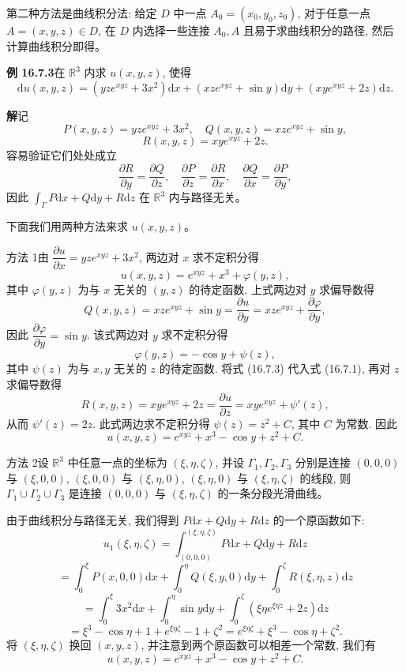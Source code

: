 \documentclass[UTF8,12pt,a4paper,fontset=fandol]{ctexart}
\begin{document}
第二种方法是曲线积分法: 给定 $D$ 中一点 $A_0=(x_0,y_0,z_0)$, 对于任意一点 $A=(x,y,z)\in D$, 在 $D$ 内选择一些连接 $A_0,A$ 且易于求曲线积分的路径, 然后计算曲线积分即得。

\noindent\textbf{例 16.7.3}\quad 在 $\mathbb R^3$ 内求 $u(x,y,z)$, 使得
\[
  \mathrm du(x,y,z)=(yze^{xyz}+3x^2)\mathrm dx+(xze^{xyz}+\sin y)\mathrm dy+(xye^{xyz}+2z)\mathrm dz.
\]

\noindent\textbf{解}\quad 记
\[
  P(x,y,z)=yze^{xyz}+3x^2,\quad Q(x,y,z)=xze^{xyz}+\sin y,
\]
\[
  R(x,y,z)=xye^{xyz}+2z.
\]
容易验证它们处处成立
\[
  \frac{\partial R}{\partial y}=\frac{\partial Q}{\partial z},\quad
  \frac{\partial P}{\partial z}=\frac{\partial R}{\partial x},\quad
  \frac{\partial Q}{\partial x}=\frac{\partial P}{\partial y},
\]
因此 $\int_\Gamma P\mathrm dx+Q\mathrm dy+R\mathrm dz$ 在 $\mathbb R^3$ 内与路径无关。

下面我们用两种方法来求 $u(x,y,z)$。

方法 1\quad 由 $\dfrac{\partial u}{\partial x}=yze^{xyz}+3x^2$, 两边对 $x$ 求不定积分得
\begin{equation}
  u(x,y,z)=e^{xyz}+x^3+\varphi(y,z),
  \tag{16.7.1}
\end{equation}
其中 $\varphi(y,z)$ 为与 $x$ 无关的 $(y,z)$ 的待定函数. 上式两边对 $y$ 求偏导数得
\begin{equation}
  Q(x,y,z)=xze^{xyz}+\sin y
  =\frac{\partial u}{\partial y}
  =xze^{xyz}+\frac{\partial\varphi}{\partial y},
  \tag{16.7.2}
\end{equation}
因此 $\dfrac{\partial\varphi}{\partial y}=\sin y$. 该式两边对 $y$ 求不定积分得
\begin{equation}
  \varphi(y,z)=-\cos y+\psi(z),
  \tag{16.7.3}
\end{equation}
其中 $\psi(z)$ 为与 $x,y$ 无关的 $z$ 的待定函数. 将式 (16.7.3) 代入式 (16.7.1), 再对 $z$ 求偏导数得
\[
  R(x,y,z)=xye^{xyz}+2z=\frac{\partial u}{\partial z}=xye^{xyz}+\psi'(z),
\]
从而 $\psi'(z)=2z$. 此式两边求不定积分得 $\psi(z)=z^2+C$, 其中 $C$ 为常数. 因此
\[
  u(x,y,z)=e^{xyz}+x^3-\cos y+z^2+C.
\]

方法 2\quad 设 $\mathbb R^3$ 中任意一点的坐标为 $(\xi,\eta,\zeta)$, 并设 $\Gamma_1,\Gamma_2,\Gamma_3$ 分别是连接 $(0,0,0)$ 与 $(\xi,0,0)$, $(\xi,0,0)$ 与 $(\xi,\eta,0)$, $(\xi,\eta,0)$ 与 $(\xi,\eta,\zeta)$ 的线段, 则 $\Gamma_1\cup\Gamma_2\cup\Gamma_3$ 是连接 $(0,0,0)$ 与 $(\xi,\eta,\zeta)$ 的一条分段光滑曲线。

由于曲线积分与路径无关, 我们得到 $P\mathrm dx+Q\mathrm dy+R\mathrm dz$ 的一个原函数如下:
\[
  u_1(\xi,\eta,\zeta)
  =\int_{(0,0,0)}^{(\xi,\eta,\zeta)}P\mathrm dx+Q\mathrm dy+R\mathrm dz
\]
\[
  =\int_0^\xi P(x,0,0)\mathrm dx
  +\int_0^\eta Q(\xi,y,0)\mathrm dy
  +\int_0^\zeta R(\xi,\eta,z)\mathrm dz
\]
\[
  =\int_0^\xi 3x^2\mathrm dx+\int_0^\eta\sin y\mathrm dy
  +\int_0^\zeta(\xi\eta e^{\xi\eta z}+2z)\mathrm dz
\]
\[
  =\xi^3-\cos\eta+1+e^{\xi\eta\zeta}-1+\zeta^2
  =e^{\xi\eta\zeta}+\xi^3-\cos\eta+\zeta^2.
\]
将 $(\xi,\eta,\zeta)$ 换回 $(x,y,z)$, 并注意到两个原函数可以相差一个常数, 我们有
\[
  u(x,y,z)=e^{xyz}+x^3-\cos y+z^2+C.
\]
\end{document}
